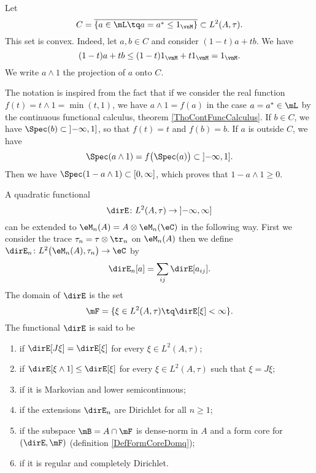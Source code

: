 Let
\begin{equation}
	C=\overline{ \{ a\in\mL\tq a=a^*\leq 1_{\vnM} \} }\subset L^2(A,\tau).
\end{equation}
This set is convex. Indeed, let $a,b\in C$ and consider $(1-t)a+tb$. We have
\begin{equation}
	(1-t)a+tb\leq(1-t)1_{\vnM}+t 1_{\vnM}=1_{\vnM}.
\end{equation}
We write $a\wedge 1$ the projection of $a$ onto $C$.

The notation is inspired from the fact that if we consider the real function $f(t)=t\wedge 1=\min(t,1)$, we have $a\wedge 1=f(a)$ in the case $a=a^*\in\mL$ by the continuous functional calculus, theorem \ref{ThoContFuncCalculus}. If $b\in C$, we have $\Spec(b)\subset\mathopen] -\infty , 1 \mathclose]$, so that $f(t)=t$ and $f(b)=b$. If $a$ is outside $C$, we have
\begin{equation}
	\Spec(a\wedge 1)=f\big( \Spec(a) \big)\subset\mathopen] -\infty , 1 \mathclose].
\end{equation}
Then we have $\Spec(1-a\wedge 1)\subset\mathopen[ 0 , \infty \mathclose]$, which proves that $1-a\wedge 1\geq 0$.

A quadratic functional
\begin{equation}
	\dirE\colon L^2(A,\tau)\to \mathopen] -\infty , \infty \mathclose]
\end{equation}
can be extended to $\eM_n(A)=A\otimes\eM_n(\eC)$ in the following way. First we consider the trace $\tau_n=\tau\otimes\tr_n$ on $\eM_n(A)$ then we define $\dirE_n\colon L^2\big( \eM_n(A),\tau_n \big)\to \eC$ by
\begin{equation}
	\dirE_n[a]=\sum_{ij}\dirE[a_{ij}].
\end{equation}
The domain of $\dirE$ is the set
\begin{equation}
	\mF=\{ \xi\in L^2(A,\tau)\tq \dirE[\xi]<\infty \}.
\end{equation}
The functional $\dirE$ is said to be
\begin{enumerate}
	\item
		 if $\dirE[J\xi]=\dirE[\xi]$ for every $\xi\in L^2(A,\tau)$;
	\item
		 if $\dirE[\xi\wedge 1]\leq\dirE[\xi]$ for every $\xi\in L^2(A,\tau)$ such that $\xi=J\xi$;
	\item
		 if it is Markovian and lower semicontinuous;
	\item
		 if the extensions $\dirE_n$ are Dirichlet for all $n\geq 1$;
	\item
		 if the subspace $\mB=A\cap\mF$ is dense-norm in $A$ and a form core for $(\dirE,\mF)$ (definition \ref{DefFormCoreDomq});
	\item
		 if it is regular and completely Dirichlet.
\end{enumerate}

